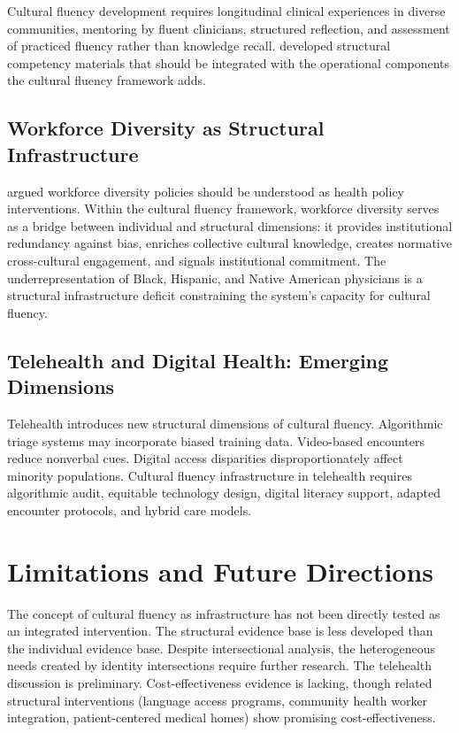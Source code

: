 \documentclass[12pt, a4paper]{article}
\begin{document}
Cultural fluency development requires longitudinal clinical experiences in diverse communities, mentoring by fluent clinicians, structured reflection, and assessment of practiced fluency rather than knowledge recall. \citet{neff2020} developed structural competency materials that should be integrated with the operational components the cultural fluency framework adds.

\subsection{Workforce Diversity as Structural Infrastructure}

\citet{saha2008} argued workforce diversity policies should be understood as health policy interventions. Within the cultural fluency framework, workforce diversity serves as a bridge between individual and structural dimensions: it provides institutional redundancy against bias, enriches collective cultural knowledge, creates normative cross-cultural engagement, and signals institutional commitment. The underrepresentation of Black, Hispanic, and Native American physicians is a structural infrastructure deficit constraining the system's capacity for cultural fluency.

\subsection{Telehealth and Digital Health: Emerging Dimensions}

Telehealth introduces new structural dimensions of cultural fluency. Algorithmic triage systems may incorporate biased training data. Video-based encounters reduce nonverbal cues. Digital access disparities disproportionately affect minority populations. Cultural fluency infrastructure in telehealth requires algorithmic audit, equitable technology design, digital literacy support, adapted encounter protocols, and hybrid care models.

\section{Limitations and Future Directions}

The concept of cultural fluency as infrastructure has not been directly tested as an integrated intervention. The structural evidence base is less developed than the individual evidence base. Despite intersectional analysis, the heterogeneous needs created by identity intersections require further research. The telehealth discussion is preliminary. Cost-effectiveness evidence is lacking, though related structural interventions (language access programs, community health worker integration, patient-centered medical homes) show promising cost-effectiveness.
\end{document}

